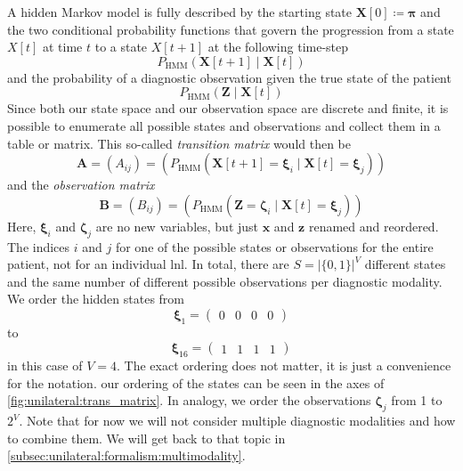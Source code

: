 \documentclass[\relativeRoot/main.tex]{subfiles}
\begin{document}
A hidden Markov model is fully described by the starting state $\mathbf{X}[0] \coloneqq \boldsymbol{\pi}$ and the two conditional probability functions that govern the progression from a state $X[t]$ at time $t$ to a state $X[t+1]$ at the following time-step
%
\begin{equation}
    P_\text{HMM}\left( \mathbf{X}[t+1] \mid \mathbf{X}[t] \right)
\end{equation}
%
and the probability of a diagnostic observation given the true state of the patient
%
\begin{equation}
    P_\text{HMM}\left( \mathbf{Z} \mid \mathbf{X}[t] \right)
\end{equation}
%
Since both our state space and our observation space are discrete and finite, it is possible to enumerate all possible states and observations and collect them in a table or matrix. This so-called \emph{transition matrix} would then be
%
\begin{equation}
    \mathbf{A} = \left( A_{ij} \right) = \left( P_\text{HMM} \left( \mathbf{X}[t+1] = \boldsymbol{\xi}_i \mid \mathbf{X}[t] = \boldsymbol{\xi}_j \right) \right)
\end{equation}
%
and the \emph{observation matrix}
%
\begin{equation}
    \mathbf{B} = \left( B_{ij} \right) = \left( P_\text{HMM} \left( \mathbf{Z} = \boldsymbol{\zeta}_i \mid \mathbf{X}[t] = \boldsymbol{\xi}_j \right) \right)
\end{equation}
%
Here, $\boldsymbol{\xi}_i$ and $\boldsymbol{\zeta}_j$ are no new variables, but just $\mathbf{x}$ and $\mathbf{z}$ renamed and reordered. The indices $i$ and $j$ for one of the possible states or observations for the entire patient, not for an individual \gls{lnl}. In total, there are $S = |\{ 0,1 \}|^V$ different states and the same number of different possible observations per diagnostic modality. We order the hidden states from
%
\begin{equation}
    \boldsymbol{\xi}_1 = 
    \begin{pmatrix}
        0 & 0 & 0 & 0
    \end{pmatrix}
\end{equation}
%
to
%
\begin{equation} \label{eq:unilateral:formulation:obs_matrix}
    \boldsymbol{\xi}_{16} = 
    \begin{pmatrix}
        1 & 1 & 1 & 1
    \end{pmatrix}
\end{equation}
%
in this case of $V = 4$. The exact ordering does not matter, it is just a convenience for the notation. our ordering of the states can be seen in the axes of \cref{fig:unilateral:trans_matrix}. In analogy, we order the observations $\boldsymbol{\zeta}_j$ from 1 to $2^V$. Note that for now we will not consider multiple diagnostic modalities and how to combine them. We will get back to that topic in \cref{subsec:unilateral:formalism:multimodality}.
\end{document}
